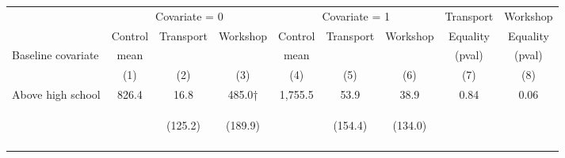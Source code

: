\begin{tabular}{lcccccccc}
\hline \noalign{\smallskip} & \multicolumn{3}{c}{Covariate = 0} & \multicolumn{3}{c}{Covariate = 1} & Transport & Workshop\\
\cmidrule(lr){2-4}\cmidrule(lr){5-7}\cmidrule(lr){8-9} & Control & {Transport} & {Workshop} & Control & {Transport} & {Workshop} & {Equality} & {Equality}\\
Baseline covariate & mean &  &  & mean &  &  & (pval) & (pval)\\
 & (1) & (2) & (3) & (4) & (5) & (6) & (7) & (8)\\
\noalign{\smallskip}\hline \noalign{\smallskip}Above high school & 826.4 & 16.8 & 485.0† & 1,755.5 & 53.9 & 38.9 & 0.84 & 0.06\\
 & \begin{footnotesize}\end{footnotesize} & \begin{footnotesize}(125.2)\end{footnotesize} & \begin{footnotesize}(189.9)\end{footnotesize} & \begin{footnotesize}\end{footnotesize} & \begin{footnotesize}(154.4)\end{footnotesize} & \begin{footnotesize}(134.0)\end{footnotesize} & \begin{footnotesize}\end{footnotesize} & \begin{footnotesize}\end{footnotesize}\\
 & \begin{footnotesize}\end{footnotesize} & \begin{footnotesize}[1.000]\end{footnotesize} & \begin{footnotesize}[0.031]\end{footnotesize} & \begin{footnotesize}\end{footnotesize} & \begin{footnotesize}[1.000]\end{footnotesize} & \begin{footnotesize}[0.751]\end{footnotesize} & \begin{footnotesize}\end{footnotesize} & \begin{footnotesize}\end{footnotesize}\\

\end{tabular}
